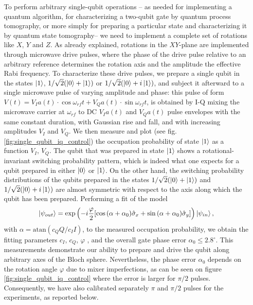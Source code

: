 To perform arbitrary single-qubit operations -- as needed for implementing a quantum algorithm,  for characterizing a two-qubit gate by quantum process tomography, or more simply for preparing a particular state and characterizing it by quantum state tomography-- we need to implement a complete set of rotations like  $X$, $Y$ and $Z$. As already explained, rotations in the $XY$-plane are implemented through microwave drive pulses, where the phase of the drive pulse relative to an arbitrary reference determines the rotation axis and the amplitude the effective Rabi frequency. To characterize these drive pulses, we prepare a single qubit in the states $\left| 1 \right>$, $1/\sqrt{2}(\left| 0 \right>+\left| 1 \right>)$ or $1/\sqrt{2}(\left| 0 \right>+i\left| 1 \right>)$, and subject it afterward to a single microwave pulse of varying amplitude and phase: this pulse of form $V(t) = V_Ia(t)\cdot\cos{\omega_{rf}t}+V_Qa(t)\cdot\sin{\omega_{rf}t}$, is obtained by I-Q mixing the microwave carrier at $\omega_{rf}$  to DC $V_Ia(t)$ and $V_Qa(t)$ pulse envelopes with the same constant duration, with Gaussian rise and fall, and with increasing amplitudes $V_I$ and $V_Q$. We then measure and plot  (see fig. \ref{fig:single_qubit_iq_control}) the occupation probability of state $\left| 1 \right>$  as a function $V_I$, $V_Q$. The qubit that was prepared in state $\left| 1 \right>$ shows a rotational-invariant switching probability pattern, which is indeed what one expects for a qubit prepared in either $\left| 0 \right>$ or $\left| 1 \right>$. On the other hand, the switching probability distributions of the qubits prepared in the states $1/\sqrt{2}(\left| 0 \right>+\left| 1 \right>)$ and $1/\sqrt{2}(\left| 0 \right>+i\left| 1 \right>)$ are almost symmetric with respect to the axis along which the qubit has been prepared. Performing a fit of the model
%
\begin{equation}
\left| \psi_{out} \right>= \exp{\left(-i\frac{\varphi}{2}[\cos{(\alpha+\alpha_0)}\hat{\sigma}_x+\sin{(\alpha+\alpha_0)}\hat{\sigma}_y]\right)}\left| \psi_{in} \right>, \label{eq:iq_model}
\end{equation}
%
with $\alpha=\mathrm{atan}{( c_Q Q/c_I I)}$, to the measured occupation probability,  we obtain the fitting parameters  $c_I$, $c_Q$, $\varphi$ , and the overall gate phase error $\alpha_0 \le 2.8^\circ $. This measurements demonstrate our ability to prepare and drive the qubit along arbitrary axes of the Bloch sphere. Nevertheless, the phase error $\alpha_0$ depends on the rotation angle $\varphi$ due to mixer imperfections,  as can be seen on figure  \ref{fig:single_qubit_iq_control} where the error is larger for $\pi/2$ pulses. Consequently, we have also calibrated separately $\pi$ and $\pi/2$ pulses for the experiments, as reported below.


